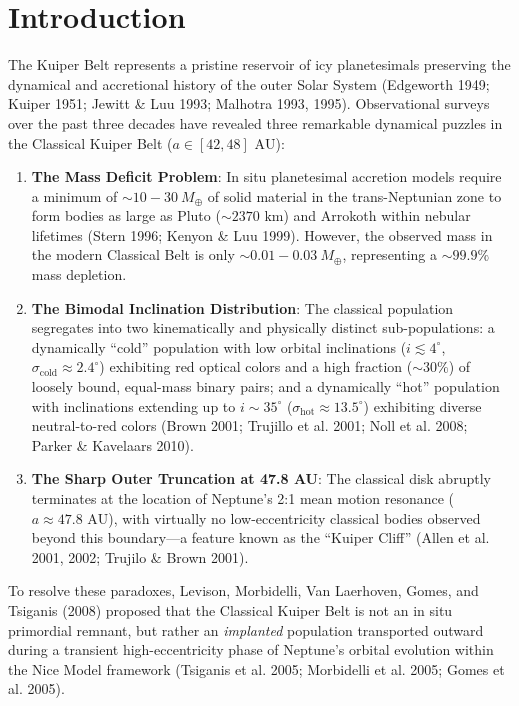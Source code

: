 \documentclass[11pt,a4paper]{article}
\begin{document}
\section{Introduction}
The Kuiper Belt represents a pristine reservoir of icy planetesimals preserving the dynamical and accretional history of the outer Solar System (Edgeworth 1949; Kuiper 1951; Jewitt \& Luu 1993; Malhotra 1993, 1995). Observational surveys over the past three decades have revealed three remarkable dynamical puzzles in the Classical Kuiper Belt ($a \in [42, 48]\text{ AU}$):
\begin{enumerate}
    \item \textbf{The Mass Deficit Problem}: In situ planetesimal accretion models require a minimum of $\sim 10 - 30\ M_\oplus$ of solid material in the trans-Neptunian zone to form bodies as large as Pluto ($\sim 2370\text{ km}$) and Arrokoth within nebular lifetimes (Stern 1996; Kenyon \& Luu 1999). However, the observed mass in the modern Classical Belt is only $\sim 0.01 - 0.03\ M_\oplus$, representing a $\sim 99.9\%$ mass depletion.
    \item \textbf{The Bimodal Inclination Distribution}: The classical population segregates into two kinematically and physically distinct sub-populations: a dynamically ``cold'' population with low orbital inclinations ($i \lesssim 4^\circ$, $\sigma_{\text{cold}} \approx 2.4^\circ$) exhibiting red optical colors and a high fraction ($\sim 30\%$) of loosely bound, equal-mass binary pairs; and a dynamically ``hot'' population with inclinations extending up to $i \sim 35^\circ$ ($\sigma_{\text{hot}} \approx 13.5^\circ$) exhibiting diverse neutral-to-red colors (Brown 2001; Trujillo et al. 2001; Noll et al. 2008; Parker \& Kavelaars 2010).
    \item \textbf{The Sharp Outer Truncation at 47.8 AU}: The classical disk abruptly terminates at the location of Neptune's 2:1 mean motion resonance ($a \approx 47.8\text{ AU}$), with virtually no low-eccentricity classical bodies observed beyond this boundary---a feature known as the ``Kuiper Cliff'' (Allen et al. 2001, 2002; Trujilo \& Brown 2001).
\end{enumerate}

To resolve these paradoxes, Levison, Morbidelli, Van Laerhoven, Gomes, and Tsiganis (2008) proposed that the Classical Kuiper Belt is not an in situ primordial remnant, but rather an \textit{implanted} population transported outward during a transient high-eccentricity phase of Neptune's orbital evolution within the Nice Model framework (Tsiganis et al. 2005; Morbidelli et al. 2005; Gomes et al. 2005).
\end{document}
